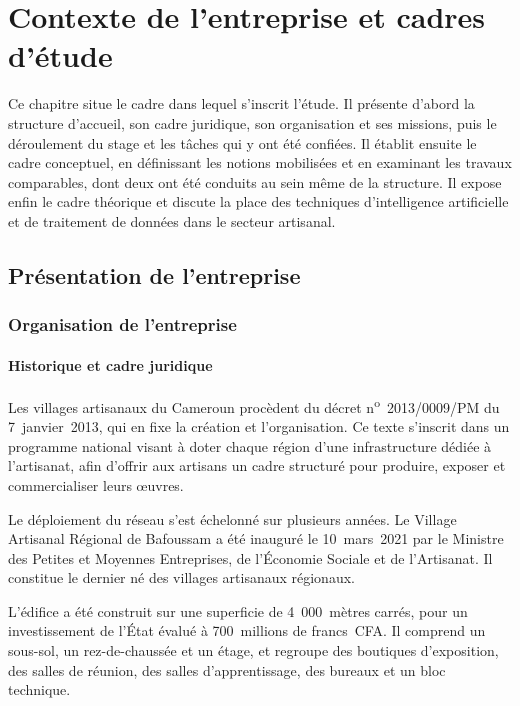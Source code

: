 \chapter{Contexte de l'entreprise et cadres d'étude}
\label{chap:un}

Ce chapitre situe le cadre dans lequel s'inscrit l'étude. Il présente d'abord la structure d'accueil, son cadre juridique, son organisation et ses missions, puis le déroulement du stage et les tâches qui y ont été confiées. Il établit ensuite le cadre conceptuel, en définissant les notions mobilisées et en examinant les travaux comparables, dont deux ont été conduits au sein même de la structure. Il expose enfin le cadre théorique et discute la place des techniques d'intelligence artificielle et de traitement de données dans le secteur artisanal.

\section{Présentation de l'entreprise}
\label{sec:1-1}

\subsection{Organisation de l'entreprise}

\subsubsection{Historique et cadre juridique}

Les villages artisanaux du Cameroun procèdent du décret n\textsuperscript{o}~2013/0009/PM du 7~janvier~2013, qui en fixe la création et l'organisation. Ce texte s'inscrit dans un programme national visant à doter chaque région d'une infrastructure dédiée à l'artisanat, afin d'offrir aux artisans un cadre structuré pour produire, exposer et commercialiser leurs œuvres.

Le déploiement du réseau s'est échelonné sur plusieurs années. Le Village Artisanal Régional de Bafoussam a été inauguré le 10~mars~2021 par le Ministre des Petites et Moyennes Entreprises, de l'Économie Sociale et de l'Artisanat. Il constitue le dernier né des villages artisanaux régionaux.

L'édifice a été construit sur une superficie de 4~000~mètres carrés, pour un investissement de l'État évalué à 700~millions de francs~CFA. Il comprend un sous-sol, un rez-de-chaussée et un étage, et regroupe des boutiques d'exposition, des salles de réunion, des salles d'apprentissage, des bureaux et un bloc technique.

